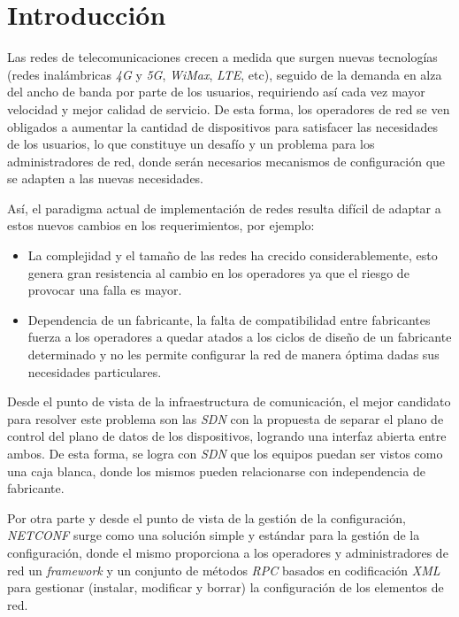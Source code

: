 
\chapter{Introducción} %

\label{Chapter1} %

Las redes de telecomunicaciones crecen a medida que surgen nuevas tecnologías (redes inalámbricas \textit{4G} y \textit{5G}, \textit{WiMax}, \textit{LTE}, etc), seguido de la demanda en alza del ancho de banda por parte de los usuarios, requiriendo así cada vez mayor velocidad y mejor calidad de servicio. De esta forma, los operadores de red se ven obligados a aumentar la cantidad de dispositivos para satisfacer las necesidades de los usuarios, lo que constituye un desafío y un problema para los administradores de red, donde serán necesarios mecanismos de configuración que se adapten a las nuevas necesidades. 

Así, el paradigma actual de implementación de redes resulta difícil de adaptar a estos nuevos cambios en los requerimientos, por ejemplo:

\begin{itemize}     
    \item La complejidad y el tamaño de las redes ha crecido considerablemente, esto genera gran resistencia al cambio en los operadores ya que el riesgo de provocar una falla es mayor.

    \item Dependencia  de  un  fabricante,  la  falta  de  compatibilidad  entre  fabricantes fuerza a los operadores a quedar atados a los ciclos de diseño de un fabricante determinado y no les permite configurar la red de manera óptima dadas sus necesidades particulares. 
\end{itemize}

Desde el punto de vista de la infraestructura de comunicación, el mejor candidato para resolver este problema son las \textit{SDN} con la propuesta de separar el plano de control del plano de datos de los dispositivos, logrando una interfaz abierta entre ambos. De esta forma, se logra con \textit{SDN} que los equipos puedan ser vistos como una caja blanca, donde los mismos pueden relacionarse con independencia de fabricante. 

Por otra parte y desde el punto de vista de la gestión de la configuración, \textit{NETCONF} surge como una solución simple y estándar para la gestión de la configuración, donde el mismo proporciona a los operadores y administradores de red un \textit{framework} y un conjunto de métodos \textit{RPC} basados en codificación \textit{XML} para gestionar (instalar, modificar y borrar) la configuración de los elementos de red.

